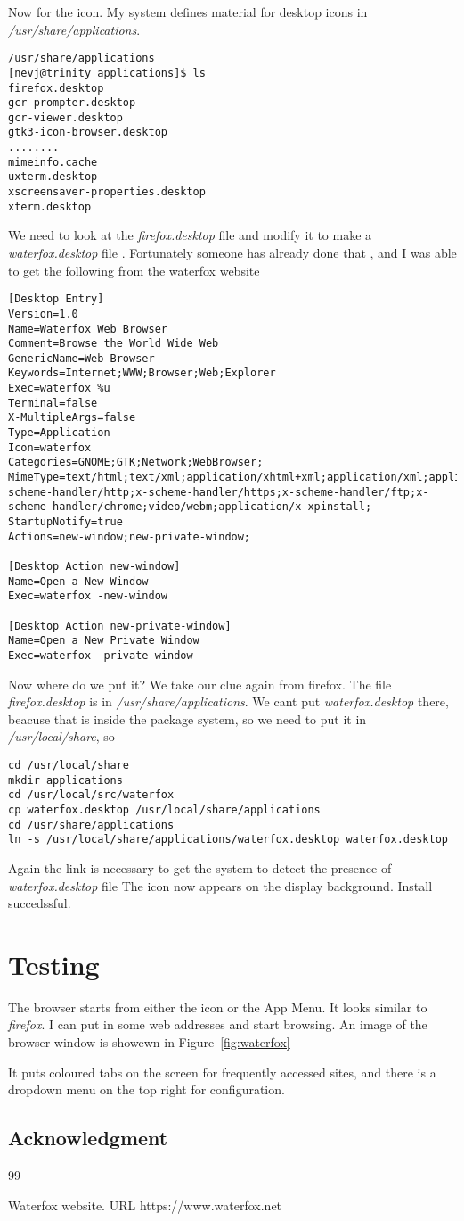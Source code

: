 \documentclass{article}  %
\begin{document}
Now for the icon. My system defines material for desktop icons in {\em /usr/share/applications}.
\begin{verbatim}
/usr/share/applications
[nevj@trinity applications]$ ls
firefox.desktop                     
gcr-prompter.desktop              
gcr-viewer.desktop               
gtk3-icon-browser.desktop       
........
mimeinfo.cache
uxterm.desktop
xscreensaver-properties.desktop
xterm.desktop
\end{verbatim}
 We need to look at the {\em firefox.desktop} file and modify it to make a {\em waterfox.desktop} file . Fortunately someone has already done that , and I was able to get the following from the waterfox website
\begin{verbatim}
[Desktop Entry]
Version=1.0
Name=Waterfox Web Browser
Comment=Browse the World Wide Web
GenericName=Web Browser
Keywords=Internet;WWW;Browser;Web;Explorer
Exec=waterfox %u
Terminal=false
X-MultipleArgs=false
Type=Application
Icon=waterfox
Categories=GNOME;GTK;Network;WebBrowser;
MimeType=text/html;text/xml;application/xhtml+xml;application/xml;application/rss+xml;application/rdf+xml;image/gif;image/jpeg;image/png;x-scheme-handler/http;x-scheme-handler/https;x-scheme-handler/ftp;x-scheme-handler/chrome;video/webm;application/x-xpinstall;
StartupNotify=true
Actions=new-window;new-private-window;

[Desktop Action new-window]
Name=Open a New Window
Exec=waterfox -new-window

[Desktop Action new-private-window]
Name=Open a New Private Window
Exec=waterfox -private-window
\end{verbatim}
 Now where do we put it?
We take our clue again from firefox. The file {\em firefox.desktop} is in {\em /usr/share/applications}. We cant put {\em waterfox.desktop} there, beacuse that is inside the package system, so we need to put it in {\em /usr/local/share}, so
\begin{verbatim}
cd /usr/local/share
mkdir applications
cd /usr/local/src/waterfox
cp waterfox.desktop /usr/local/share/applications
cd /usr/share/applications
ln -s /usr/local/share/applications/waterfox.desktop waterfox.desktop
\end{verbatim}
Again the link is necessary to get the system to detect the presence of {\em waterfox.desktop} file
The icon now appears on the display background. 
Install succedssful. 

\section{Testing}
The browser starts from either the icon or the App Menu. It looks similar to {\em firefox}. I can put in some web addresses and start browsing. An image of the browser window is showewn in Figure~\ref{fig:waterfox}

It puts coloured tabs on the screen for frequently accessed sites, and there is a dropdown menu on the top right for configuration. 


\subsection{Acknowledgment}

\begin{thebibliography}{99}

Waterfox website. URL https://www.waterfox.net

\end{thebibliography}
\end{document}
